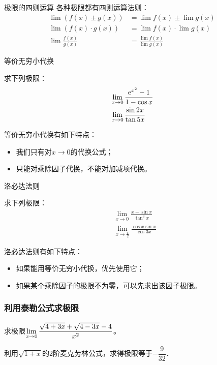 \documentclass[14pt,notheorems,leqno,xcolor={rgb}]{beamer} %
\begin{document}
\begin{frame}{极限的四则运算}\transblindshorizontal %
各种极限都有四则运算法则：
\begin{align}
\lim(f(x) \pm g(x)) &= \lim f(x) \pm \lim g(x) \\
\lim(f(x) \cdot g(x)) &= \lim f(x) \cdot \lim g(x) \\
\lim\frac{f(x)}{g(x)} &= \frac{\lim f(x)}{\lim g(x)}
\end{align}
\end{frame}

\begin{frame}{等价无穷小代换}\transblindsvertical %
\begin{example}求下列极限：
\begin{align}
&\lim_{x\to0}\frac{\mathrm{e}^{x^2}-1}{1-\cos x} \\
&\lim_{x\to0}\frac{\sin 2x}{\tan 5x}
\end{align}
\pause
\begin{fact*}
等价无穷小代换有如下特点：
\begin{itemize}[<+->]
\item 我们只有对$x\to0$的代换公式；
\item 只能对乘除因子代换，不能对加减项代换。
\end{itemize}
\end{fact*}
\end{example}
\end{frame}

\begin{frame}{洛必达法则}\transsplithorizontalin %
\begin{example}求下列极限：
\begin{align}
&\lim_{x\to0}\frac{x-\sin x}{\tan^3x} \\
&\lim_{x\to\frac{\pi}{2}}\frac{\cos x\sin x}{\cos 3x}
\end{align}
\pause
\begin{fact*}
洛必达法则有如下特点：
\begin{itemize}[<+->]
\item 如果能用等价无穷小代换，优先使用它；
\item 如果某个乘除因子的极限不为零，可以先求出该因子极限。
\end{itemize}
\end{fact*}
\end{example}
\end{frame}

\begin{sframe}
\frametitle{利用泰勒公式求极限}
\begin{example}
求极限$\lim\limits_{x\to0}\dfrac{\sqrt{4+3x}+\sqrt{4-3x}-4}{x^2}$。
\end{example}
\pause
\begin{solution}
利用$\sqrt{1+x}$的$2$阶麦克劳林公式，求得极限等于$-\dfrac{9}{32}$．
\end{solution}
\end{sframe}
\end{document}
